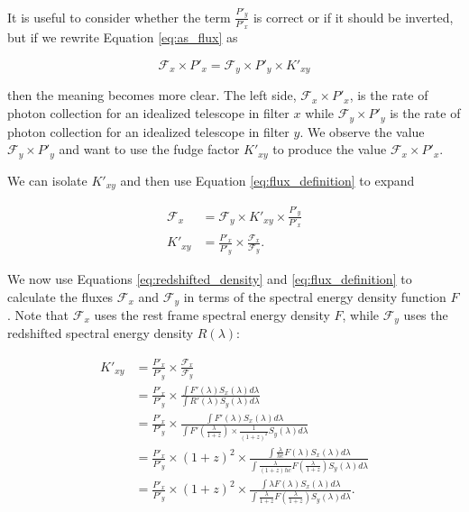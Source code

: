 \documentclass[linenumbers]{aastex631}
\begin{document}
It is useful to consider whether the term $\frac{P'_y}{P'_x}$ is correct or if
it should be inverted, but if we rewrite Equation \ref{eq:as_flux} as

\begin{equation}
  \mathcal{F}_x \times P'_x = \mathcal{F}_y \times P'_y \times K'_{xy}
\end{equation}

\noindent then the meaning becomes more clear. The left side, $\mathcal{F}_x
\times P'_x$, is the rate of photon collection for an idealized telescope in
filter $x$ while $\mathcal{F}_y \times P'_y$ is the rate of photon collection
for an idealized telescope in filter $y$. We observe the value $\mathcal{F}_y
\times P'_y$ and want to use the fudge factor $K'_{xy}$ to produce the value
$\mathcal{F}_x \times P'_x$.

We can isolate $K'_{xy}$ and then use Equation \ref{eq:flux_definition} to expand

\begin{equation}
\begin{aligned}
  \mathcal{F}_x &= \mathcal{F}_y \times K'_{xy} \times \frac{P'_y}{P'_x} \\
        K'_{xy} &= \frac{P'_x}{P'_y} \times \frac{\mathcal{F}_x}{\mathcal{F}_y} .
\end{aligned}
\end{equation}

We now use Equations \ref{eq:redshifted_density} and \ref{eq:flux_definition}
to calculate the fluxes $\mathcal{F}_x$ and $\mathcal{F}_y$ in terms of the
spectral energy density function $F$. Note that $\mathcal{F}_x$ uses the rest
frame spectral energy density $F$, while $\mathcal{F}_y$ uses the redshifted
spectral energy density $R(\lambda)$:

\begin{equation}
\begin{aligned}
  K'_{xy} &= \frac{P'_x}{P'_y} \times \frac{\mathcal{F}_x}{\mathcal{F}_y} \\
         &= \frac{P'_x}{P'_y} \times
              \frac{\int F'(\lambda) S_x(\lambda) d\lambda}
                   {\int R'(\lambda) S_y(\lambda) d\lambda} \\
         &= \frac{P'_x}{P'_y} \times
              \frac{\int F'(\lambda) S_x(\lambda) d\lambda}
                   {\int F'(\frac{\lambda}{1+z}) \times \frac{1}{(1 + z)^2} S_y(\lambda) d\lambda} \\
         &= \frac{P'_x}{P'_y} \times (1+z)^2 \times
              \frac{\int \frac{\lambda}{hc} F(\lambda) S_x(\lambda) d\lambda}
                   {\int \frac{\lambda}{(1+z)hc} F\left(\frac{\lambda}{1+z}\right) S_y(\lambda) d\lambda} \\
         &= \frac{P'_x}{P'_y} \times (1 + z)^2 \times
              \frac{\int \lambda F(\lambda) S_x(\lambda) d\lambda}
                   {\int \frac{\lambda}{1+z} F\left(\frac{\lambda}{1+z}\right) S_y(\lambda) d\lambda} .
\end{aligned}
\end{equation}
\end{document}
